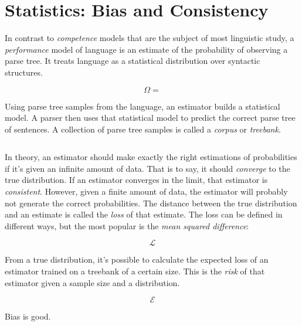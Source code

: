 \section{Statistics: Bias and Consistency}\label{sec:Statistics}



In contrast to \emph{competence} models that are the subject of most linguistic study, a \emph{performance} model of language is an estimate of the probability of observing a parse tree. It treats language as a statistical distribution over syntactic structures.

$$\Omega = $$

Using parse tree samples from the language, an estimator builds a statistical model. A parser then uses that statistical model to predict the correct parse tree of sentences.
A collection of parse tree samples is called a \emph{corpus} or \emph{treebank}.

$$  $$

In theory, an estimator should make exactly the right estimations of probabilities if it's given an infinite amount of data. That is to say, it should \emph{converge} to the true distribution. If an estimator converges in the limit, that estimator is \emph{consistent}.
However, given a finite amount of data, the estimator will probably not generate the correct probabilities. The distance between the true distribution and an estimate is called the \emph{loss} of that estimate. The loss can be defined in different ways, but the most popular is the \emph{mean squared difference}:

$$ \mathcal{L} $$

From a true distribution, it's possible to calculate the expected loss of an estimator trained on a treebank of a certain size. This is the \emph{risk} of that estimator given a sample size and a distribution.

$$ \mathcal{E} $$










Bias is good.
